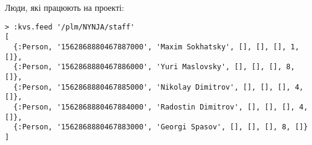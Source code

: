     Люди, які працюють на проекті:

   \begin{lstlisting}
> :kvs.feed '/plm/NYNJA/staff'
[
  {:Person, '1562868880467887000', 'Maxim Sokhatsky', [], [], [], 1, []},
  {:Person, '1562868880467886000', 'Yuri Maslovsky', [], [], [], 8, []},
  {:Person, '1562868880467885000', 'Nikolay Dimitrov', [], [], [], 4, []},
  {:Person, '1562868880467884000', 'Radostin Dimitrov', [], [], [], 4, []},
  {:Person, '1562868880467883000', 'Georgi Spasov', [], [], [], 8, []}
]
    \end{lstlisting}

